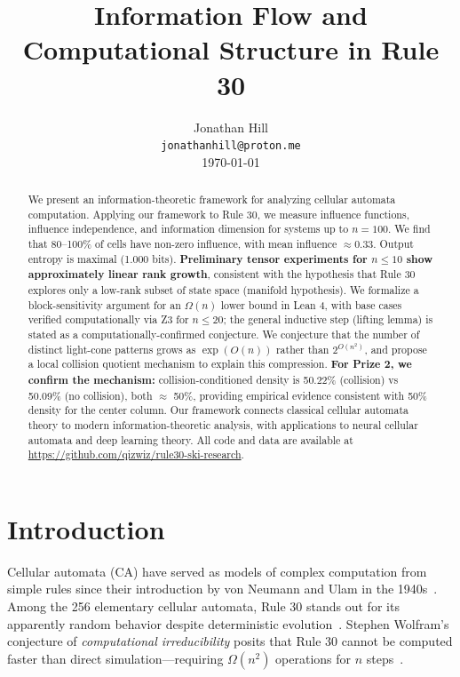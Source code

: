 \documentclass[11pt]{article}
\title{Information Flow and Computational Structure in Rule 30}
\author{
    Jonathan Hill \\
    \texttt{jonathanhill@proton.me} \\
    \today
}
\date{}
\begin{document}
\maketitle

\begin{abstract}
We present an information-theoretic framework for analyzing cellular automata computation. Applying our framework to Rule 30, we measure influence functions, influence independence, and information dimension for systems up to $n=100$. We find that 80--100\% of cells have non-zero influence, with mean influence $\approx 0.33$. Output entropy is maximal (1.000 bits). \textbf{Preliminary tensor experiments for $n \leq 10$ show approximately linear rank growth}, consistent with the hypothesis that Rule 30 explores only a low-rank subset of state space (manifold hypothesis). We formalize a block-sensitivity argument for an $\Omega(n)$ lower bound in Lean 4, with base cases verified computationally via Z3 for $n \leq 20$; the general inductive step (lifting lemma) is stated as a computationally-confirmed conjecture. We conjecture that the number of distinct light-cone patterns grows as $\exp(O(n))$ rather than $2^{O(n^2)}$, and propose a local collision quotient mechanism to explain this compression. \textbf{For Prize 2, we confirm the mechanism:} collision-conditioned density is 50.22\% (collision) vs 50.09\% (no collision), both $\approx$ 50\%, providing empirical evidence consistent with 50\% density for the center column. Our framework connects classical cellular automata theory to modern information-theoretic analysis, with applications to neural cellular automata and deep learning theory. All code and data are available at \url{https://github.com/qizwiz/rule30-ski-research}.
\end{abstract}

\section{Introduction}

Cellular automata (CA) have served as models of complex computation from simple rules since their introduction by von Neumann and Ulam in the 1940s~\citep{von_neumann_1966}. Among the 256 elementary cellular automata, Rule 30 stands out for its apparently random behavior despite deterministic evolution~\citep{wolfram_1983}. Stephen Wolfram's conjecture of \emph{computational irreducibility} posits that Rule 30 cannot be computed faster than direct simulation---requiring $\Omega(n^2)$ operations for $n$ steps~\citep{wolfram_2002}.
\end{document}

